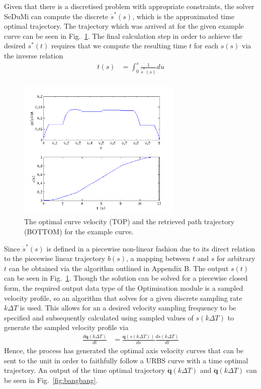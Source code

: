 Given that there is a discretised problem with appropriate constraints, the solver SeDuMi can compute the discrete $\dot{s}^*(s)$, which is the approximated time optimal trajectory. The trajectory which was arrived at for the given example curve can be seen in Fig.~\ref{fig:sdot_st}.
The final calculation step in order to achieve the desired $s^*(t)$ requires that we compute the resulting time $t$ for each $s(s)$ via the inverse relation
\begin{align*}
t(s) &= \int_0^s\frac{1}{\dot{s}^*(s)}du\\ 
\end{align*}

\begin{figure}[htbp]
\centering
\includegraphics[width=0.7\textwidth]{figures/optimisation/sdot_st.png}
\caption[$\dot{s}^*(s)$ and $s^*(t)$]{
The optimal curve velocity (TOP) and the retrieved path trajectory (BOTTOM) for the example curve.
\label{fig:sdot_st}}
\end{figure}

Since $\dot{s}^*(s)$ is defined in a piecewise non-linear fashion due to its direct relation to the piecewise linear trajectory $b(s)$, a mapping between $t$ and $s$ for arbitrary $t$ can be obtained via the algorithm outlined in Appendix B. The output $s(t)$ can be seen in Fig.~\ref{fig:sdot_st}. Though the solution can be solved for a piecewise closed form, the required output data type of the Optimisation module is a sampled velocity profile, so an algorithm that solves for a given discrete sampling rate $k\Delta T$ is used. This allows for an a desired velocity sampling frequency to be specified and subsequently calculated using sampled values of $s(k\Delta T)$ to generate the sampled velocity profile via 
\begin{align*}
\frac{d\textbf{q}\left(k \Delta T\right)}{dt} &= \frac{\textbf{q}\left(s(k\Delta T)\right)}{ds}\frac{ds(k\Delta T)}{dt}
\end{align*}
Hence, the process has generated the optimal axis velocity curves that can be sent to the unit in order to faithfully follow a URBS curve with a time optimal trajectory.
An output of the time optimal trajectory $\dot{\textbf{q}}(k\Delta T)$ and $\ddot{\textbf{q}}(k\Delta T)$ can be seen in Fig.~\ref{fig:bangbang}.

